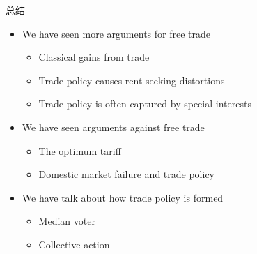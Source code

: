 \documentclass[10pt,hyperref={CJKbookmarks=true},xcolor=dvipsnames,aspectratio=169]{beamer}
\begin{document}
\begin{frame}{总结}
\begin{itemize}
	\item We have seen more arguments for free trade
	\begin{itemize}
		\item Classical gains from trade
		\item Trade policy causes rent seeking distortions
		\item Trade policy is often captured by special interests
	\end{itemize}
	\item We have seen arguments against free trade
	\begin{itemize}
		\item The optimum tariff
		\item Domestic market failure and trade policy
	\end{itemize}
	\item We have talk about how trade policy is formed
	\begin{itemize}
		\item Median voter
		\item Collective action
	\end{itemize}
\end{itemize}
\end{frame}
\end{document}
